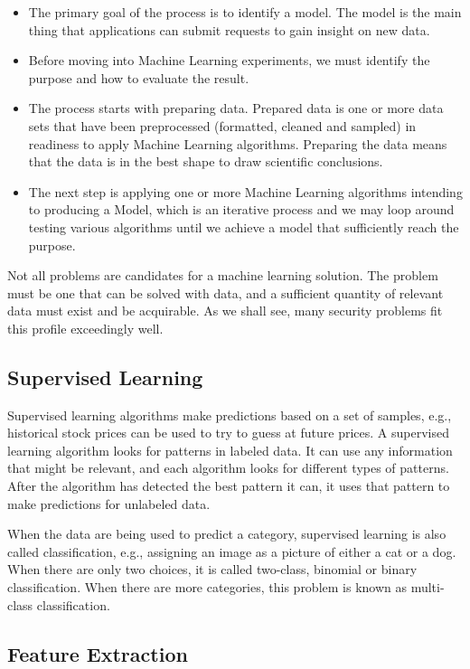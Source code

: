 \begin{itemize}
\item The primary goal of the process is to identify a model. The model is the main thing that applications can submit requests to gain insight on new data.
\item Before moving into Machine Learning experiments, we must identify the purpose and how to evaluate the result.
\item The process starts with preparing data. Prepared data is one or more data sets that have been preprocessed (formatted, cleaned and sampled) in readiness to apply Machine Learning algorithms. Preparing the data means that the data is in the best shape to draw scientific conclusions.
\item The next step is applying one or more Machine Learning algorithms intending to producing a Model, which is an iterative process and we may loop around testing various algorithms until we achieve a model that sufficiently reach the purpose.
\end{itemize}

Not all problems are candidates for a machine learning solution. The problem must be one that can be solved with data, and a sufficient quantity of relevant data must exist and be acquirable. As we shall see, many security problems fit this profile exceedingly well.

\subsection{Supervised Learning}
\label{ssec:supervised-learning}

Supervised learning algorithms make predictions based on a set of samples, e.g., historical stock prices can be used to try to guess at future prices. A supervised learning algorithm looks for patterns in labeled data. It can use any information that might be relevant, and each algorithm looks for different types of patterns. After the algorithm has detected the best pattern it can, it uses that pattern to make predictions for unlabeled data.

When the data are being used to predict a category, supervised learning is also called classification, e.g., assigning an image as a picture of either a cat or a dog. When there are only two choices, it is called two-class, binomial or binary classification. When there are more categories, this problem is known as multi-class classification.

\subsection{Feature Extraction}

